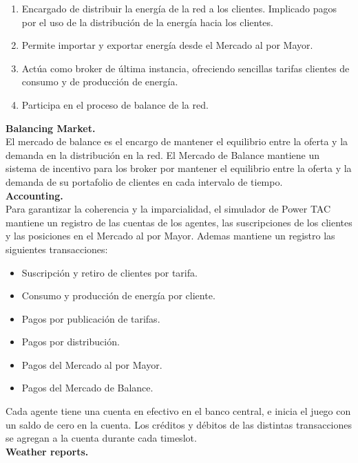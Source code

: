 \begin{enumerate}
	\item Encargado de distribuir la energía de la red a los clientes. Implicado pagos por el uso de la distribución de la energía hacia los clientes.
	\item Permite importar y exportar energía desde el Mercado al por Mayor.
	\item Actúa como broker de última instancia, ofreciendo sencillas tarifas clientes de consumo y de producción de energía.
	\item Participa en el proceso de balance de la red.
\end{enumerate}

\textbf{Balancing Market.}\\

El mercado de balance es el encargo de mantener el equilibrio entre la oferta y la demanda en la distribución en la red. El Mercado de Balance mantiene un sistema de incentivo para los broker por mantener el equilibrio entre la oferta y la demanda de su portafolio de clientes en cada intervalo de tiempo.\\

\textbf{Accounting.}\\

Para garantizar la coherencia y la imparcialidad, el simulador de Power TAC mantiene un registro de las cuentas de los agentes, las suscripciones de los clientes y las posiciones en el Mercado al por Mayor. Ademas mantiene un registro las siguientes transacciones:

\begin{itemize}
	\item Suscripción y retiro de clientes por tarifa.
	\item Consumo y producción de energía por cliente.
	\item Pagos por publicación de tarifas.
	\item Pagos por distribución.
	\item Pagos del Mercado al por Mayor.
	\item Pagos del Mercado de Balance.    
\end{itemize}

Cada agente tiene una cuenta en efectivo en el banco central, e inicia el juego con un saldo de cero en la cuenta. Los créditos y débitos de las distintas transacciones se agregan a la cuenta durante cada timeslot.\\

\textbf{Weather reports.}\\


